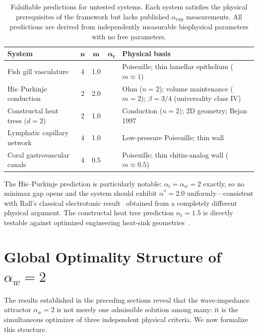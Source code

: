 \documentclass[11pt,a4paper]{article}
\theoremstyle{remark}
\begin{document}
\begin{table}[h]
\centering
\small
\caption{Falsifiable predictions for untested systems. Each system satisfies the physical prerequisites of the framework but lacks published $\alpha_{\exp}$ measurements. All predictions are derived from independently measurable biophysical parameters with no free parameters.}
\label{tab:predictions}
\begin{tabular}{@{}l c c c p{5.3cm}@{}}
\toprule
\textbf{System} & $\boldsymbol{n}$ & $\boldsymbol{m}$ & $\boldsymbol{\alpha_t}$ & \textbf{Physical basis} \\
\midrule
Fish gill vasculature & 4 & 1.0 & \atFishGill{} & Poiseuille; thin lamellar
epithelium ($m\approx1$) \\
His--Purkinje conduction & 2 & 2.0 & \atHP{} & Ohm ($n=2$); volume maintenance
($m=2$); $\beta=3/4$ (universality class IV) \\
Constructal heat trees ($d=2$) & 2 & 1.0 & \atConstructal{} & Conduction
($n=2$); 2D geometry; Bejan 1997 \\
Lymphatic capillary network & 4 & 1.0 & \atLymphatic{} & Low-pressure
Poiseuille; thin wall \\
Coral gastrovascular canals & 4 & 0.5 & \atCoral{} & Poiseuille; thin
chitin-analog wall ($m\approx0.5$) \\
\bottomrule
\end{tabular}
\end{table}

\noindent The His--Purkinje prediction is particularly notable: $\alpha_t = \alpha_w = 2$ exactly, so no minimax gap opens and the system should exhibit $\alpha^* = 2.0$ uniformly---consistent with Rall's classical electrotonic result~\cite{rall1959} obtained from a completely different physical argument. The constructal heat tree prediction $\alpha_t = 1.5$ is directly testable against optimized engineering heat-sink geometries~\cite{bejan1997}.

\section{Global Optimality Structure of $\alpha_w = 2$}

The results established in the preceding sections reveal that the wave-impedance
attractor $\alpha_w = 2$ is not merely one admissible solution among many: it is
the simultaneous optimizer of three independent physical criteria. We now
formalize this structure.
\end{document}
